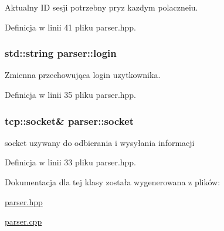 Aktualny ID sesji potrzebny pryz kazdym polaczneiu. 



Definicja w linii 41 pliku parser.hpp.\hypertarget{a00005_8bb124a2f285074773d1b0ee62cf0cc0}{
\subsubsection[{login}]{\setlength{\rightskip}{0pt plus 5cm}std::string {\bf parser::login}}}
\label{dd/dad/a00005_8bb124a2f285074773d1b0ee62cf0cc0}


Zmienna przechowująca login uzytkownika. 



Definicja w linii 35 pliku parser.hpp.\hypertarget{a00005_835f5d6b548278a3e00d2c423336e903}{
\subsubsection[{socket}]{\setlength{\rightskip}{0pt plus 5cm}tcp::socket\& {\bf parser::socket}}}
\label{dd/dad/a00005_835f5d6b548278a3e00d2c423336e903}


socket uzywany do odbierania i wysyłania informacji 



Definicja w linii 33 pliku parser.hpp.

Dokumentacja dla tej klasy została wygenerowana z plików:\begin{CompactItemize}
\item 
\hyperlink{a00015}{parser.hpp}\item 
\hyperlink{a00014}{parser.cpp}\end{CompactItemize}
